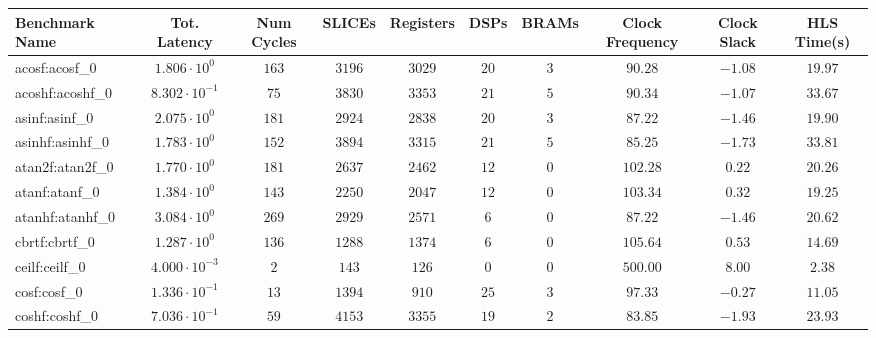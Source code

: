 \begin{tabular}{|l|c|c|c|c|c|c|c|c|c|}
\hline
Benchmark Name               & Tot. Latency            & Num Cycles & SLICEs    & Registers & DSPs    & BRAMs  & Clock Frequency & Clock Slack & HLS Time(s) \\
\hline
acosf:acosf\_0               & $ 1.806 \cdot 10^{0}  $ & $ 163    $ & $ 3196  $ & $ 3029  $ & $ 20  $ & $ 3  $ & $ 90.28       $ & $ -1.08   $ & $ 19.97   $ \\
acoshf:acoshf\_0             & $ 8.302 \cdot 10^{-1} $ & $ 75     $ & $ 3830  $ & $ 3353  $ & $ 21  $ & $ 5  $ & $ 90.34       $ & $ -1.07   $ & $ 33.67   $ \\
asinf:asinf\_0               & $ 2.075 \cdot 10^{0}  $ & $ 181    $ & $ 2924  $ & $ 2838  $ & $ 20  $ & $ 3  $ & $ 87.22       $ & $ -1.46   $ & $ 19.90   $ \\
asinhf:asinhf\_0             & $ 1.783 \cdot 10^{0}  $ & $ 152    $ & $ 3894  $ & $ 3315  $ & $ 21  $ & $ 5  $ & $ 85.25       $ & $ -1.73   $ & $ 33.81   $ \\
atan2f:atan2f\_0             & $ 1.770 \cdot 10^{0}  $ & $ 181    $ & $ 2637  $ & $ 2462  $ & $ 12  $ & $ 0  $ & $ 102.28      $ & $ 0.22    $ & $ 20.26   $ \\
atanf:atanf\_0               & $ 1.384 \cdot 10^{0}  $ & $ 143    $ & $ 2250  $ & $ 2047  $ & $ 12  $ & $ 0  $ & $ 103.34      $ & $ 0.32    $ & $ 19.25   $ \\
atanhf:atanhf\_0             & $ 3.084 \cdot 10^{0}  $ & $ 269    $ & $ 2929  $ & $ 2571  $ & $ 6   $ & $ 0  $ & $ 87.22       $ & $ -1.46   $ & $ 20.62   $ \\
cbrtf:cbrtf\_0               & $ 1.287 \cdot 10^{0}  $ & $ 136    $ & $ 1288  $ & $ 1374  $ & $ 6   $ & $ 0  $ & $ 105.64      $ & $ 0.53    $ & $ 14.69   $ \\
ceilf:ceilf\_0               & $ 4.000 \cdot 10^{-3} $ & $ 2      $ & $ 143   $ & $ 126   $ & $ 0   $ & $ 0  $ & $ 500.00      $ & $ 8.00    $ & $ 2.38    $ \\
cosf:cosf\_0                 & $ 1.336 \cdot 10^{-1} $ & $ 13     $ & $ 1394  $ & $ 910   $ & $ 25  $ & $ 3  $ & $ 97.33       $ & $ -0.27   $ & $ 11.05   $ \\
coshf:coshf\_0               & $ 7.036 \cdot 10^{-1} $ & $ 59     $ & $ 4153  $ & $ 3355  $ & $ 19  $ & $ 2  $ & $ 83.85       $ & $ -1.93   $ & $ 23.93   $ \\

\end{tabular}

